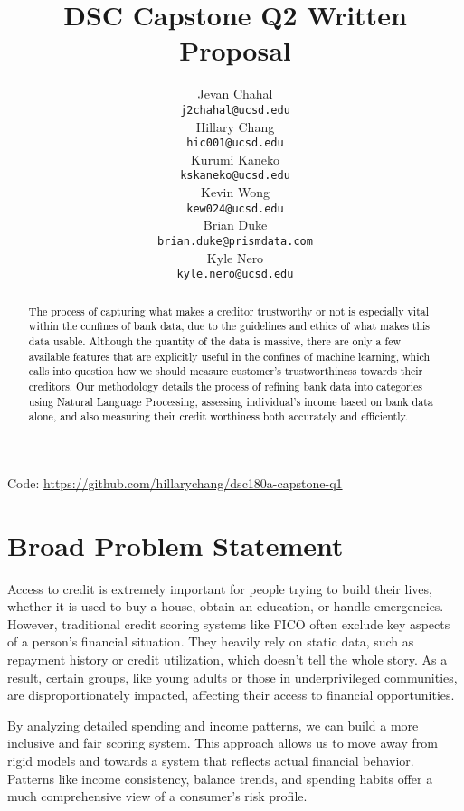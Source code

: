 \documentclass[12pt,letterpaper]{article}
\title{DSC Capstone Q2 Written Proposal}
\author{Jevan Chahal\\
  {\tt j2chahal@ucsd.edu} \\\And
  Hillary Chang \\
  {\tt hic001@ucsd.edu} \\\And
  Kurumi Kaneko \\
  {\tt kskaneko@ucsd.edu} \\\And
  Kevin Wong \\
  {\tt kew024@ucsd.edu} \\\And
  Brian Duke \\
  {\tt brian.duke@prismdata.com} \\\And
  Kyle Nero \\
  {\tt kyle.nero@ucsd.edu} \\}
\begin{document}
\maketitle

\begin{abstract}
    \textcolor{Black}{
    The process of capturing what makes a creditor trustworthy or not is especially vital within the confines of bank data, due to the guidelines and ethics of what makes this data usable. Although the quantity of the data is massive, there are only a few available features that are explicitly useful in the confines of machine learning, which calls into question how we should measure customer's trustworthiness towards their creditors. Our methodology details the process of refining bank data into categories using Natural Language Processing, assessing individual's income based on bank data alone, and also measuring their credit worthiness both accurately and efficiently. 
    }
\end{abstract}

\begin{center}
Code: \url{https://github.com/hillarychang/dsc180a-capstone-q1}
\end{center}

\tableofcontents
\clearpage


\section{Broad Problem Statement}
Access to credit is extremely important for people trying to build their lives, whether it is used to buy a house, obtain an education, or handle emergencies. However, traditional credit scoring systems like FICO often exclude key aspects of a person’s financial situation. They heavily rely on static data, such as repayment history or credit utilization, which doesn’t tell the whole story. As a result, certain groups, like young adults or those in underprivileged communities, are disproportionately impacted, affecting their access to financial opportunities.

By analyzing detailed spending and income patterns, we can build a more inclusive and fair scoring system. This approach allows us to move away from rigid models and towards a system that reflects actual financial behavior. Patterns like income consistency, balance trends, and spending habits offer a much comprehensive view of a consumer’s risk profile.
\end{document}
